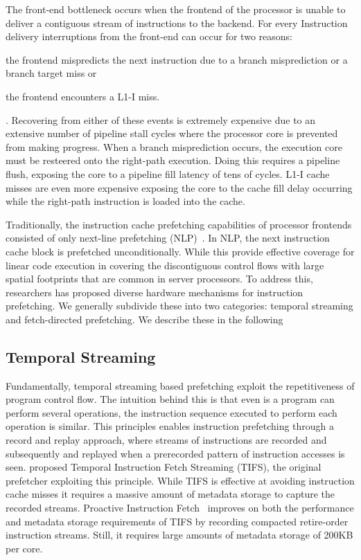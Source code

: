 \documentclass[../main.tex]{subfiles}
\begin{document}
\begin{refsection}
The front-end bottleneck occurs when the frontend of the processor is
unable to deliver a contiguous stream of instructions to the
backend.
For every Instruction delivery interruptions from the front-end can
occur for two reasons: \begin{inparaenum}[1)] \item the frontend
  mispredicts the next instruction due to a branch misprediction or a
  branch target miss or \item the frontend encounters a L1-I
  miss.\end{inparaenum}. Recovering from either of these events is
extremely expensive due to an extensive number of pipeline stall
cycles where the processor core is prevented from making
progress. When a branch misprediction occurs, the execution core must
be resteered onto the right-path execution. Doing this requires a
pipeline flush, exposing the core to a pipeline fill latency of tens
of cycles. L1-I cache misses are even more expensive exposing the core
to the cache fill delay occurring while the right-path instruction is
loaded into the cache.

Traditionally, the instruction cache prefetching capabilities of
processor frontends consisted of only next-line prefetching
(NLP)~\cite{nextline_pref}. In NLP, the next instruction cache block
is prefetched unconditionally. While this provide effective coverage
for linear code execution in covering the discontiguous control flows
with large spatial footprints that are common in server processors. To
address this, researchers has proposed diverse hardware mechanisms for
instruction prefetching. We generally subdivide these into two
categories: temporal streaming and fetch-directed prefetching. We describe these in the following

\subsection{Temporal Streaming} Fundamentally, temporal streaming
based prefetching exploit the repetitiveness of program control
flow. The intuition behind this is that even is a program can perform
several operations, the instruction sequence executed to perform each
operation is similar. This principles enables instruction prefetching
through a record and replay approach, where streams of instructions
are recorded and subsequently and replayed when a prerecorded pattern
of instruction accesses is seen. \textcite{ferdman08_tempor} proposed
Temporal Instruction Fetch Streaming (TIFS), the original prefetcher
exploiting this principle. While TIFS is effective at avoiding
instruction cache misses it requires a massive amount of metadata
storage to capture the recorded streams.  Proactive Instruction
Fetch~\cite{ferdman11_proac_instr_fetch} improves on both the
performance and metadata storage requirements of TIFS by recording
compacted retire-order instruction streams. Still, it requires large
amounts of metadata storage of 200KB per core.  


\end{refsection}
\end{document}
